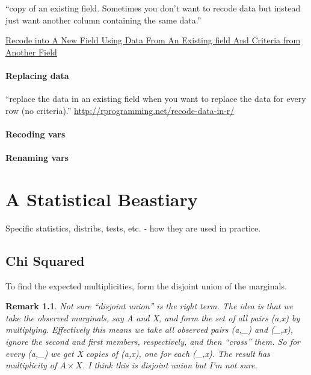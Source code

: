 \documentclass[reqno,12pt]{tufte-book}
\numberwithin{equation}{subsection}
\newtheorem{remark}{Remark}
\begin{document}
``copy of an existing field. Sometimes you don’t want to recode data but instead just want another column containing the same data.''

\href{http://rprogramming.net/recode-data-in-r/}{Recode into A New Field Using Data From An Existing field And Criteria from Another Field}

\subsection{Replacing data}
\label{subs:}

``replace the data in an existing field when you want to replace the data for every row (no criteria).'' \url{http://rprogramming.net/recode-data-in-r/}

\subsection{Recoding vars}
\label{sub:recodingvars}

\subsection{Renaming vars}
\label{sub:renamingvars}


\part{A Statistical Beastiary}

Specific statistics, distribs, tests, etc. - how they are used in practice.

\chapter{Chi Squared}
\label{sect:chisquared}

To find the expected multiplicities, form the disjoint union of the marginals.

\begin{remark}
  Not sure ``disjoint union'' is the right term.  The idea is that we
  take the observed marginals, say A and X, and form the set of all
  pairs (a,x) by multiplying.  Effectively this means we take all
  observed pairs (a,\_) and (\_,x), ignore the second and first
  members, respectively, and then ``cross'' them.  So for every (a,\_)
  we get X copies of (a,x), one for each (\_,x).  The result has
  multiplicity of \(A\times X\).  I think this is disjoint union but
  I'm not sure.
\end{remark}
\end{document}
